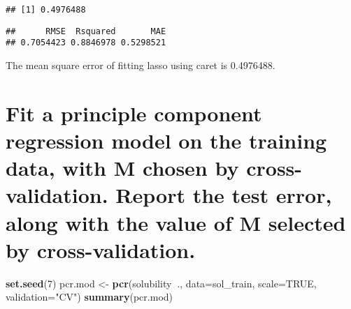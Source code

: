 \documentclass[]{article}
\newenvironment{Shaded}{\begin{snugshade}}{\end{snugshade}}
\newcommand{\DataTypeTok}[1]{\textcolor[rgb]{0.13,0.29,0.53}{#1}}
\newcommand{\DecValTok}[1]{\textcolor[rgb]{0.00,0.00,0.81}{#1}}
\newcommand{\KeywordTok}[1]{\textcolor[rgb]{0.13,0.29,0.53}{\textbf{#1}}}
\newcommand{\NormalTok}[1]{#1}
\newcommand{\OperatorTok}[1]{\textcolor[rgb]{0.81,0.36,0.00}{\textbf{#1}}}
\newcommand{\OtherTok}[1]{\textcolor[rgb]{0.56,0.35,0.01}{#1}}
\newcommand{\StringTok}[1]{\textcolor[rgb]{0.31,0.60,0.02}{#1}}
\begin{document}
\begin{Shaded}
\end{Shaded}

\begin{verbatim}
## [1] 0.4976488
\end{verbatim}

\begin{Shaded}
\end{Shaded}

\begin{verbatim}
##      RMSE  Rsquared       MAE 
## 0.7054423 0.8846978 0.5298521
\end{verbatim}

The mean square error of fitting lasso using caret is 0.4976488.

\hypertarget{fit-a-principle-component-regression-model-on-the-training-data-with-m-chosen-by-cross-validation.-report-the-test-error-along-with-the-value-of-m-selected-by-cross-validation.}{%
\section{Fit a principle component regression model on the training
data, with M chosen by cross-validation. Report the test error, along
with the value of M selected by
cross-validation.}\label{fit-a-principle-component-regression-model-on-the-training-data-with-m-chosen-by-cross-validation.-report-the-test-error-along-with-the-value-of-m-selected-by-cross-validation.}}

\begin{Shaded}
\begin{Highlighting}[]
\KeywordTok{set.seed}\NormalTok{(}\DecValTok{7}\NormalTok{)}
\NormalTok{pcr.mod <-}\StringTok{ }\KeywordTok{pcr}\NormalTok{(solubility}\OperatorTok{~}\NormalTok{.,}
               \DataTypeTok{data=}\NormalTok{sol_train,}
               \DataTypeTok{scale=}\OtherTok{TRUE}\NormalTok{,}
               \DataTypeTok{validation=}\StringTok{"CV"}\NormalTok{) }
\KeywordTok{summary}\NormalTok{(pcr.mod)}
\end{Highlighting}
\end{Shaded}
\end{document}

